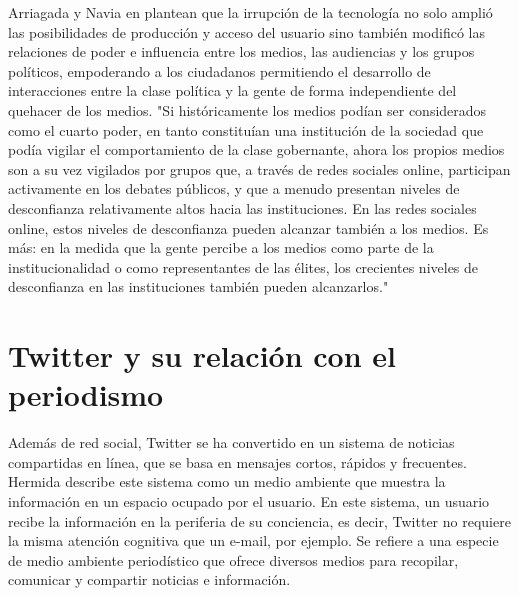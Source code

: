 Arriagada y Navia en \cite{intermedio2013} plantean que la irrupción de la tecnología no solo amplió las posibilidades de producción y acceso del usuario sino también modificó las relaciones de poder e influencia entre los medios, las audiencias y los grupos políticos, empoderando a los ciudadanos permitiendo el desarrollo de interacciones entre la clase política y la gente de forma independiente del quehacer de los medios. "Si históricamente los medios podían ser considerados como el cuarto poder, en tanto constituían una institución de la sociedad que podía vigilar el comportamiento de la clase gobernante, ahora los propios medios son a su vez vigilados por grupos que, a través de redes sociales online, participan activamente en los debates públicos, y que a menudo presentan niveles de desconfianza relativamente altos hacia las instituciones. En las redes sociales online, estos niveles de desconfianza pueden alcanzar también a los medios. Es más: en la medida que la gente percibe a los medios como parte de la institucionalidad o como representantes de las élites, los crecientes niveles de desconfianza en las instituciones también pueden alcanzarlos."

\section{Twitter y su relación con el periodismo}

Además de red social, Twitter se ha convertido en un sistema de noticias compartidas en línea, que se basa en mensajes cortos, rápidos y frecuentes. Hermida \cite{hermida2010twittering}
describe este sistema como un medio ambiente que muestra la información en un espacio ocupado por el usuario.
En este sistema, un usuario recibe la información en la periferia de su conciencia, es decir, Twitter no requiere la misma atención cognitiva que un e-mail, por ejemplo. Se refiere a una especie de medio ambiente periodístico que ofrece diversos medios para recopilar, comunicar y compartir noticias e información. 


